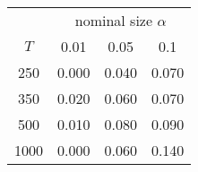 % 
\begin{tabular}{cccc}
  \hline
  & \multicolumn{3}{c}{nominal size $\alpha$} \\
 $T$ & 0.01 & 0.05 & 0.1 \\
 \hline
250 & 0.000 & 0.040 & 0.070 \\ 
  350 & 0.020 & 0.060 & 0.070 \\ 
  500 & 0.010 & 0.080 & 0.090 \\ 
  1000 & 0.000 & 0.060 & 0.140 \\ 
   \hline
\end{tabular}
